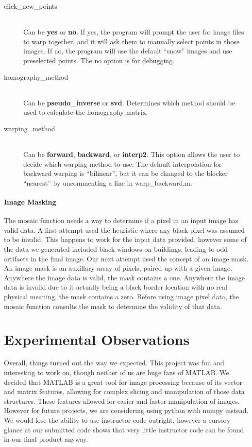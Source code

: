 \documentclass[11pt, letterpaper]{article}
\begin{document}
\begin{description}
\item[click\_new\_points] \hfill \\
  Can be {\bf yes} or {\bf no}. If yes, the program will prompt the user
  for image files to warp together, and it will ask them to manually
  select points in those images. If no, the program will use the default
  ``snow'' images and use preselected points. The no option is for
  debugging.
  
\item[homography\_method] \hfill \\
  Can be {\bf pseudo\_inverse} or {\bf svd}. Determines which method
  should be used to calculate the homography matrix.
  
\item[warping\_method] \hfill \\
  Can be {\bf forward}, {\bf backward}, or {\bf interp2}. This option
  allows the user to decide which warping method to use. The default
  interpolation for backward warping is ``bilinear'', but it can be
  changed to the blocker ``nearest'' by uncommenting a line in
  warp\_backward.m.
\end{description}

\paragraph{Image Masking}
The mosaic function needs a way to determine if a pixel in an input image has valid data. A first attempt used the heuristic where any black pixel was assumed to be invalid. This happens to work for the input data provided, however some of the data we generated included black windows on buildings, leading to odd artifacts in the final image. Our next attempt used the concept of an image mask. An image mask is an auxillary array of pixels, paired up with a given image. Anywhere the image data is valid, the mask contains a one. Anywhere the image data is invalid due to it actually being a black border location with no real physical meaning, the mask contains a zero. Before using image pixel data, the mosaic function consults the mask to determine the validity of that data.

\section{Experimental Observations}
Overall, things turned out the way we expected. This project was fun
and interesting to work on, though neither of us are huge fans of
MATLAB. We decided that MATLAB is a great tool for image processing
because of its vector and matrix features, allowing for complex
slicing and manipulation of those data structures. These features
allowed for easier and faster manipulation of images. However for future projects, we are considering using python with numpy instead. We would lose the ability to use instructor code outright, however a cursory glance at our submitted code shows that very little instructor code can be found in our final product anyway.
\end{document}
